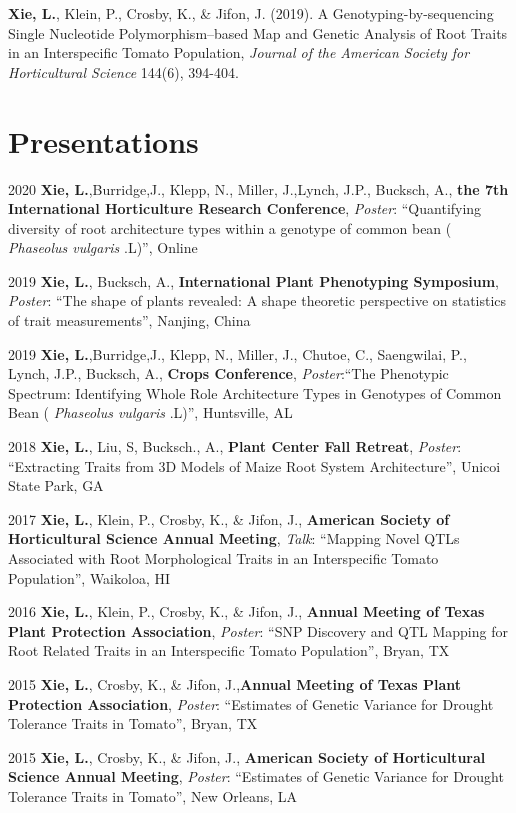 \documentclass[11pt, a4paper]{awesome-cv}
\begin{document}
\textbf{Xie, L.}, Klein, P., Crosby, K., \& Jifon, J. (2019). A
Genotyping-by-sequencing Single Nucleotide Polymorphism--based Map and
Genetic Analysis of Root Traits in an Interspecific Tomato Population,
\emph{Journal of the American Society for Horticultural Science} 144(6),
394-404.

\section{Presentations}\label{presentations}

2020 \textbf{Xie, L.},Burridge,J., Klepp, N., Miller, J.,Lynch, J.P.,
Bucksch, A., \textbf{the 7th International Horticulture Research
Conference}, \emph{Poster}: ``Quantifying diversity of root architecture
types within a genotype of common bean ( \emph{Phaseolus vulgaris}
.L)'', Online

2019 \textbf{Xie, L.}, Bucksch, A., \textbf{International Plant
Phenotyping Symposium}, \emph{Poster}: ``The shape of plants revealed: A
shape theoretic perspective on statistics of trait measurements'',
Nanjing, China

2019 \textbf{Xie, L.},Burridge,J., Klepp, N., Miller, J., Chutoe, C.,
Saengwilai, P., Lynch, J.P., Bucksch, A., \textbf{Crops Conference},
\emph{Poster}:``The Phenotypic Spectrum: Identifying Whole Role
Architecture Types in Genotypes of Common Bean ( \emph{Phaseolus
vulgaris} .L)'', Huntsville, AL

2018 \textbf{Xie, L.}, Liu, S, Bucksch., A., \textbf{Plant Center Fall
Retreat}, \emph{Poster}: ``Extracting Traits from 3D Models of Maize
Root System Architecture'', Unicoi State Park, GA

2017 \textbf{Xie, L.}, Klein, P., Crosby, K., \& Jifon, J.,
\textbf{American Society of Horticultural Science Annual Meeting},
\emph{Talk}: ``Mapping Novel QTLs Associated with Root Morphological
Traits in an Interspecific Tomato Population'', Waikoloa, HI

2016 \textbf{Xie, L.}, Klein, P., Crosby, K., \& Jifon, J.,
\textbf{Annual Meeting of Texas Plant Protection Association},
\emph{Poster}: ``SNP Discovery and QTL Mapping for Root Related Traits
in an Interspecific Tomato Population'', Bryan, TX

2015 \textbf{Xie, L.}, Crosby, K., \& Jifon, J.,\textbf{Annual Meeting
of Texas Plant Protection Association}, \emph{Poster}: ``Estimates of
Genetic Variance for Drought Tolerance Traits in Tomato'', Bryan, TX

2015 \textbf{Xie, L.}, Crosby, K., \& Jifon, J., \textbf{American
Society of Horticultural Science Annual Meeting}, \emph{Poster}:
``Estimates of Genetic Variance for Drought Tolerance Traits in
Tomato'', New Orleans, LA
\end{document}
